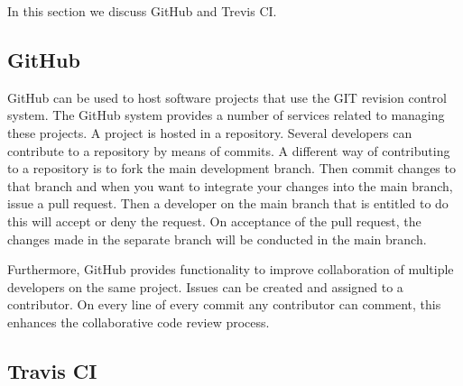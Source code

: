 In this section we discuss GitHub and Trevis CI.

\subsection{GitHub}
GitHub can be used to host software projects that use the GIT revision control system. 
The GitHub system provides a number of services related to managing these projects. 
A project is hosted in a repository. 
Several developers can contribute to a repository by means of commits. 
A different way of contributing to a repository is to fork the main development branch.
Then commit changes to that branch and when you want to integrate your changes into the main branch, issue a pull request.
Then a developer on the main branch that is entitled to do this will accept or deny the request.
On acceptance of the pull request, the changes made in the separate branch will be conducted in the main branch.

Furthermore, GitHub provides functionality to improve collaboration of multiple developers on the same project.
Issues can be created and assigned to a contributor. 
On every line of every commit any contributor can comment, this enhances the collaborative code review process.

\subsection{Travis CI}
